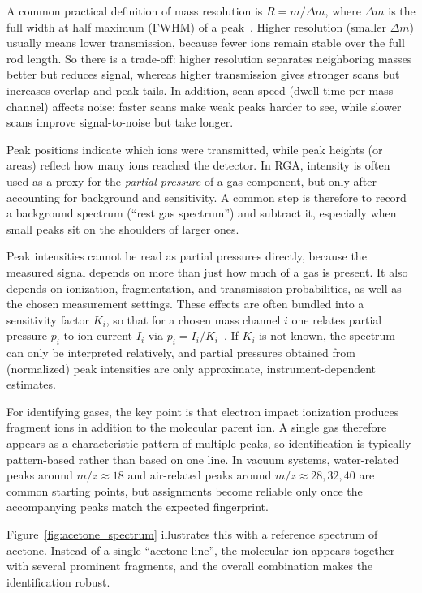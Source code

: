 \documentclass[a4paper]{article}
\begin{document}
A common practical definition of mass resolution is $R=m/\Delta m$, where $\Delta m$ is the full width at half maximum (FWHM) of a peak~\cite{jousten_ellefson_partialdruckmessung_2017}.
Higher resolution (smaller $\Delta m$) usually means lower transmission, because fewer ions remain stable over the full rod length.
So there is a trade-off: higher resolution separates neighboring masses better but reduces signal, whereas higher transmission gives stronger scans but increases overlap and peak tails.
In addition, scan speed (dwell time per mass channel) affects noise: faster scans make weak peaks harder to see, while slower scans improve signal-to-noise but take longer.

Peak positions indicate which ions were transmitted, while peak heights (or areas) reflect how many ions reached the detector.
In RGA, intensity is often used as a proxy for the \emph{partial pressure} of a gas component, but only after accounting for background and sensitivity.
A common step is therefore to record a background spectrum (``rest gas spectrum'') and subtract it, especially when small peaks sit on the shoulders of larger ones.

Peak intensities cannot be read as partial pressures directly, because the measured signal depends on more than just how much of a gas is present.
It also depends on ionization, fragmentation, and transmission probabilities, as well as the chosen measurement settings.
These effects are often bundled into a sensitivity factor $K_i$, so that for a chosen mass channel $i$ one relates partial pressure $p_i$ to ion current $I_i$ via $p_i = I_i/K_i$~\cite{jousten_ellefson_partialdruckmessung_2017}.
If $K_i$ is not known, the spectrum can only be interpreted relatively, and partial pressures obtained from (normalized) peak intensities are only approximate, instrument-dependent estimates.

For identifying gases, the key point is that electron impact ionization produces fragment ions in addition to the molecular parent ion.
A single gas therefore appears as a characteristic pattern of multiple peaks, so identification is typically pattern-based rather than based on one line.
In vacuum systems, water-related peaks around $m/z\approx 18$ and air-related peaks around $m/z\approx 28,32,40$ are common starting points, but assignments become reliable only once the accompanying peaks match the expected fingerprint.

Figure~\ref{fig:acetone_spectrum} illustrates this with a reference spectrum of acetone.
Instead of a single ``acetone line'', the molecular ion appears together with several prominent fragments, and the overall combination makes the identification robust.
\end{document}
